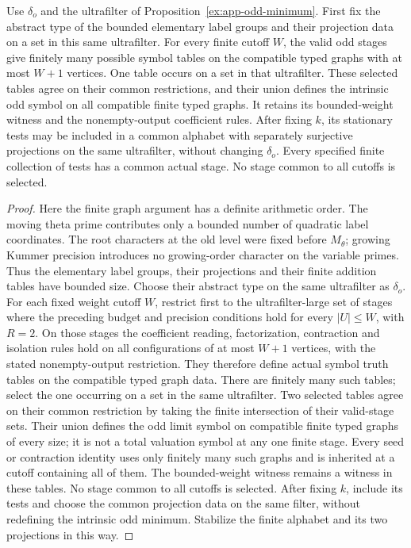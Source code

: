 \begin{proposition}\label{ex:app-odd-stabilization}
Use $\delta_o$ and the ultrafilter of
Proposition~\ref{ex:app-odd-minimum}. First fix the abstract type of
the bounded elementary label groups and their projection data on
a set in this same ultrafilter. For every finite cutoff $W$,
the valid odd stages give finitely many possible symbol tables on
the compatible typed graphs with at most $W+1$ vertices.
One table occurs on a set in that ultrafilter. These selected tables
agree on their common restrictions, and their union defines the
intrinsic odd symbol on all compatible finite typed graphs.
It retains its bounded-weight witness and the nonempty-output
coefficient rules. After fixing $k$, its stationary tests may be
included in a common alphabet with separately surjective
projections on the same ultrafilter, without changing $\delta_o$.
Every specified finite collection of tests has a common actual
stage. No stage common to all cutoffs is selected.
\end{proposition}
\begin{proof}\leavevmode
Here the finite graph argument has a definite arithmetic order.
The moving theta prime contributes only a bounded number of quadratic
label coordinates. The root characters at the old level were fixed
before $M_\theta$; growing Kummer precision introduces no growing-order
character on the variable primes. Thus the elementary label groups,
their projections and their finite addition tables have bounded size.
Choose their abstract type on the same ultrafilter as $\delta_o$.
For each fixed weight cutoff $W$, restrict first to the
ultrafilter-large set of stages where the preceding budget and
precision conditions hold for every $|U|\le W$, with $R=2$.
On those stages the coefficient reading, factorization, contraction
and isolation rules hold on all configurations of at most $W+1$
vertices, with the stated nonempty-output restriction.  They therefore define actual symbol truth tables on
the compatible typed graph data.  There are finitely many such
tables; select the one occurring on a set in the same ultrafilter.
Two selected tables agree on their common restriction by taking
the finite intersection of their valid-stage sets. Their union defines
the odd limit symbol on compatible finite typed graphs of every size;
it is not a total valuation symbol at any one finite stage.
Every seed or contraction identity uses only finitely many such graphs
and is inherited at a cutoff containing all of them.
The bounded-weight witness remains a witness in these tables.
No stage common to all cutoffs is selected.
After fixing $k$, include its tests and choose the common projection
data on the same filter, without redefining the intrinsic odd minimum.
Stabilize the finite alphabet and its two projections in this way.
\end{proof}

